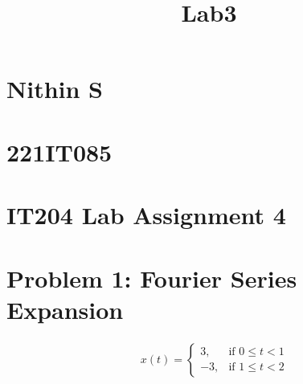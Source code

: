 \documentclass[11pt]{article}
\title{Lab3}
\begin{document}
    
    \maketitle
    
    

    
    \hypertarget{nithin-s}{%
\section{Nithin S}\label{nithin-s}}

\hypertarget{it085}{%
\section{221IT085}\label{it085}}

    \hypertarget{it204-lab-assignment-4}{%
\section{IT204 Lab Assignment 4}\label{it204-lab-assignment-4}}

    \hypertarget{problem-1-fourier-series-expansion}{%
\section{Problem 1: Fourier Series
Expansion}\label{problem-1-fourier-series-expansion}}

    \[
\begin{align*}
 \quad x(t) = \begin{cases}
3, & \text{if } 0 \leq t < 1 \\
-3, & \text{if } 1 \leq t < 2
\end{cases}
\end{align*}
\]
\end{document}
